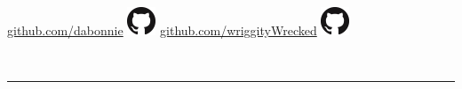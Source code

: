 \documentclass[11pt,twoside,a4paper]{article}
\begin{document}
{\begin{minipage}[t]{0.33\textwidth}
\begin{flushright}
                \linebreak
                \href{https://github.com/dabonnie}{github.com/dabonnie} \space\space \includegraphics[scale=0.225]{GitHub-Mark-32px}\hspace{1px}
                \linebreak
                \href{https://github.com/wriggityWrecked}{github.com/wriggityWrecked} \space\space \includegraphics[scale=0.225]{GitHub-Mark-32px}\hspace{1px}
                \linebreak
            \end{flushright}
        \end{minipage}
        \\
        \textcolor{lightGray}{\rule{570px}{0.4pt}}
        \setlength{\columnsep}{20px}
        \begin{multicols}{2}

\end{multicols}}
\end{document}
